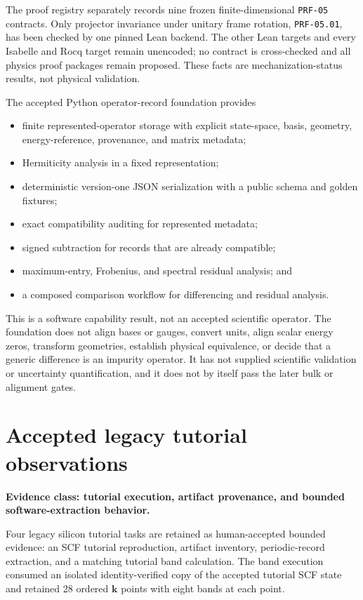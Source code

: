 The proof registry separately records nine frozen finite-dimensional
\texttt{PRF-05} contracts. Only projector invariance under unitary frame
rotation, \texttt{PRF-05.01}, has been checked by one pinned Lean backend. The
other Lean targets and every Isabelle and Rocq target remain unencoded; no
contract is cross-checked and all physics proof packages remain proposed. These
facts are mechanization-status results, not physical validation.

The accepted Python operator-record foundation provides

\begin{itemize}
  \item finite represented-operator storage with explicit state-space, basis,
    geometry, energy-reference, provenance, and matrix metadata;
  \item Hermiticity analysis in a fixed representation;
  \item deterministic version-one JSON serialization with a public schema and
    golden fixtures;
  \item exact compatibility auditing for represented metadata;
  \item signed subtraction for records that are already compatible;
  \item maximum-entry, Frobenius, and spectral residual analysis; and
  \item a composed comparison workflow for differencing and residual analysis.
\end{itemize}

This is a software capability result, not an accepted scientific operator. The
foundation does not align bases or gauges, convert units, align scalar energy
zeros, transform geometries, establish physical equivalence, or decide that a
generic difference is an impurity operator. It has not supplied scientific
validation or uncertainty quantification, and it does not by itself pass the
later bulk or alignment gates.

\section{Accepted legacy tutorial observations}

\textbf{Evidence class: tutorial execution, artifact provenance, and bounded
software-extraction behavior.}

Four legacy silicon tutorial tasks are retained as human-accepted bounded
evidence: an SCF tutorial reproduction, artifact inventory, periodic-record
extraction, and a matching tutorial band calculation. The band execution
consumed an isolated identity-verified copy of the accepted tutorial SCF state
and retained 28 ordered $\mathbf k$ points with eight bands at each point.

